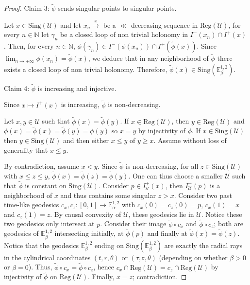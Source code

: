 \documentclass[a4paper,12pt]{article}
\def\r{\mathfrak{r}}
\def\U{\mathcal U}
\def\N{\mathbb N}
\def\sing{\mathrm{Sing}}
\newcommand{\mass}[1]{{\mathbb E}^{1,2}_{#1}}
\def\Reg{\mathrm{Reg}}
\def\reg{\Reg}
\begin{document}
\begin{proof}
\item Claim 3: $\widetilde \phi$ sends singular points to singular points.

Let $x\in \sing(\U)$ and  let $x_n\xrightarrow x$ be a $\ll$ decreasing sequence  in $\Reg(\U)$, for every $n\in \N$ let  $\gamma_n$ be a closed loop of non trivial holonomy in $I^-(x_n)\cap I^+(x)$. Then, for every $n\in\N$, $\phi(\gamma_n) \in I^-(\phi(x_n))\cap I^+(\widetilde \phi(x))$. Since $\lim_{n\rightarrow +\infty}\phi(x_n)=\widetilde \phi(x)$, we deduce that in any neighborhood of  $\widetilde \phi$ there exists a closed loop of non trivial holonomy. Therefore, $\widetilde \phi(x)\in\sing(\mass{\beta})$.

\item Claim 4: $\widetilde \phi$ is increasing and injective.

 Since $x\mapsto I^+(x)$ is increasing, $\widetilde \phi$ is non-decreasing. 

Let $x,y\in \U$ such that $\widetilde \phi(x)=\widetilde \phi(y)$. If  $x\in \Reg(\U)$, then $y\in \Reg(\U)$ and $\phi(x)=\widetilde \phi(x)=\widetilde \phi(y)=\phi(y)$ so $x=y$ by injectivity of $\phi$. 
If $x\in \sing(\U)$ then $y\in \sing(\U)$ and then  either $x\leq y$ of $y\geq x$. Assume without loss of generality that $x\leq y$.  

By contradiction, assume $x<y$. Since $\widetilde \phi$ is non-decreasing, for all $z\in \sing(\U)$ with $x\leq z\leq y$, $\widetilde \phi(x)=\widetilde\phi(z)=\widetilde \phi(y)$. One can thus choose a smaller $\U$ such that $\widetilde \phi$ is constant on $ \sing(\U)$. 
Consider $p\in I^+_\U(x)$, then $I^-_\U(p)$ is a neighborhood of $x$ and thus contains some singular $z>x$. Consider two past time-like geodesics $c_x,c_z:[0,1]\rightarrow \mass{\alpha}$ with $c_x(0)=c_z(0)=p$, $c_x(1)=x$ and $c_z(1)=z$. By causal convexity of $\U$, these geodesics lie in $\U$.  Notice these two geodesics only intersect at $p$. Consider their image $\widetilde \phi\circ c_x$ and $\widetilde \phi \circ c_z$; both are geodesics of $\mass{\beta}$ intersecting initially, at $\widetilde \phi(p)$ and finally at $\widetilde\phi(x)=\widetilde\phi(z)$. Notice that the geodesics $\mass{\beta}$ ending on $\sing(\mass{\beta})$ are exactly the radial rays in the cylindrical coordinates $(t,r,\theta)$ or $(\tau,\r,\theta)$ (depending on whether $\beta>0$ or $\beta=0$). Thus, $\widetilde \phi \circ c_x = \widetilde \phi \circ c_z $, hence $c_x\cap \reg(\U)=c_z\cap\reg(\U)$ by injectivity of $\widetilde\phi$ on $\reg(\U)$. Finally, $x=z$; contradiction. 




\end{proof}
\end{document}
